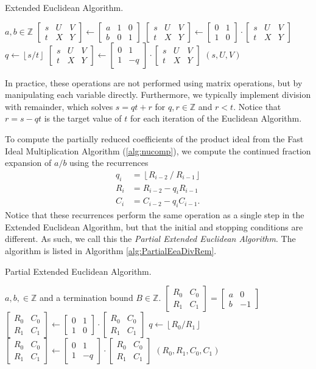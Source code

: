 \documentclass{ucalgthes1}
\theoremstyle{definition}
\newcommand{\ZZ}{\mathbb{Z}}
\newcommand{\matrixtt}[4]{\left[ \begin{array}{rr} #1 & #2 \\ #3 & #4 \end{array} \right]}
\newcommand{\matrixThreeTwo}[6]{\left[ \begin{array}{rrr} #1 & #2 & #3 \\ #4 & #5 & #6 \end{array} \right]}
\newcommand{\floor}[1]{\left\lfloor #1 \right\rfloor}
\begin{document}
\begin{algorithm}[h]
\caption{Extended Euclidean Algorithm.}
\label{alg:EeaDivRem}
\begin{algorithmic}[1]
\REQUIRE $a,b \in \ZZ$
\STATE $\matrixThreeTwo{s}{U}{V}{t}{X}{Y} \gets 
        \matrixThreeTwo{a}{1}{0}{b}{0}{1}$
	\STATE $\matrixThreeTwo{s}{U}{V}{t}{X}{Y} \gets
	        \matrixtt{0}{1}{1}{0} \cdot \matrixThreeTwo{s}{U}{V}{t}{X}{Y}$
\ENDIF
{}
	\STATE $q \gets \floor{s / t}$
	\STATE $\matrixThreeTwo{s}{U}{V}{t}{X}{Y} \gets \matrixtt{0}{1}{1}{-q} \cdot
		    \matrixThreeTwo{s}{U}{V}{t}{X}{Y}$ 
\ENDWHILE
\RETURN $(s, U, V)$ 
\end{algorithmic}
\end{algorithm}

In practice, these operations are not performed using matrix operations, but by manipulating each variable directly.  Furthermore, we typically implement division with remainder, which solves $s = qt + r$ for $q,r \in \ZZ$ and $r < t$.  Notice that $r = s - qt$ is the target value of $t$ for each iteration of the Euclidean Algorithm.  

To compute the partially reduced coefficients of the product ideal from the Fast Ideal Multiplication Algorithm (\ref{alg:nucomp}), we compute the continued fraction expansion of $a/b$ using the recurrences
\begin{align*}
	q_i &= \floor{R_{i-2} ~/~ R_{i-1}} \\
	R_i &= R_{i-2} - q_i R_{i-1} \\
	C_i &= C_{i-2} - q_i C_{i-1}.
\end{align*}
Notice that these recurrences perform the same operation as a single step in the Extended Euclidean Algorithm, but that the initial and stopping conditions are different.  As such, we call this the \emph{Partial Extended Euclidean Algorithm}.    The algorithm is listed in Algorithm \ref{alg:PartialEeaDivRem}.

\begin{algorithm}[h]
\caption{Partial Extended Euclidean Algorithm.}
\label{alg:PartialEeaDivRem}
\begin{algorithmic}[1]
\REQUIRE $a,b, \in \ZZ$ and a termination bound $B \in \ZZ$.
\STATE $\matrixtt{R_0}{C_0}{R_1}{C_1} = \matrixtt{a}{0}{b}{-1}$
	\STATE $\matrixtt{R_0}{C_0}{R_1}{C_1} \gets
	        \matrixtt{0}{1}{1}{0} \cdot \matrixtt{R_0}{C_0}{R_1}{C_1}$
\ENDIF
{}
	\STATE $q \gets \floor{R_0 / R_1}$
	\STATE $\matrixtt{R_0}{C_0}{R_1}{C_1} \gets \matrixtt{0}{1}{1}{-q} \cdot
		    \matrixtt{R_0}{C_0}{R_1}{C_1}$ 
\ENDWHILE
\RETURN $(R_0, R_1, C_0, C_1)$
\end{algorithmic}
\end{algorithm}
\end{document}
